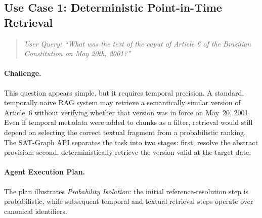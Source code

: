 \documentclass[11pt]{article}
\begin{document}
\subsection{Use Case 1: Deterministic Point-in-Time Retrieval}

\begin{quote}
\textit{User Query: ``What was the text of the caput of Article 6 of the Brazilian Constitution on May 20th, 2001?''}
\end{quote}

\paragraph{Challenge.}
This question appears simple, but it requires temporal precision. A standard, temporally naive RAG system may retrieve a semantically similar version of Article~6 without verifying whether that version was in force on May~20, 2001. Even if temporal metadata were added to chunks as a filter, retrieval would still depend on selecting the correct textual fragment from a probabilistic ranking. The SAT-Graph API separates the task into two stages: first, resolve the abstract provision; second, deterministically retrieve the version valid at the target date.

\paragraph{Agent Execution Plan.}
The plan illustrates \textit{Probability Isolation}: the initial reference-resolution step is probabilistic, while subsequent temporal and textual retrieval steps operate over canonical identifiers.
\end{document}
